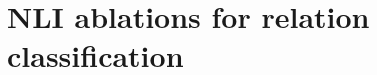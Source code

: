 \section{NLI ablations for relation classification}\label{section:results-nli-ablations-for-relation-classification}
